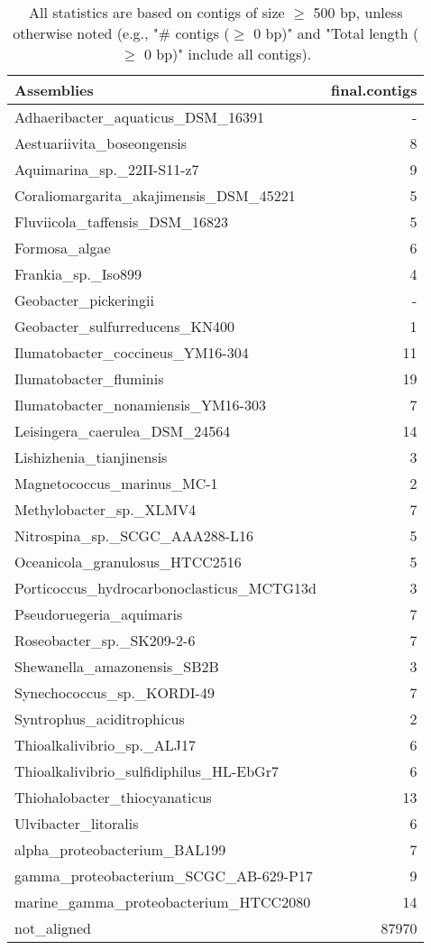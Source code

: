 \documentclass[12pt,a4paper]{article}
\begin{document}
\begin{table}[ht]
\begin{center}
\caption{All statistics are based on contigs of size $\geq$ 500 bp, unless otherwise noted (e.g., "\# contigs ($\geq$ 0 bp)" and "Total length ($\geq$ 0 bp)" include all contigs).}
\begin{tabular}{|l*{1}{|r}|}
\hline
Assemblies & final.contigs \\ \hline
Adhaeribacter\_aquaticus\_DSM\_16391 & - \\ \hline
Aestuariivita\_boseongensis & 8 \\ \hline
Aquimarina\_sp.\_22II-S11-z7 & 9 \\ \hline
Coraliomargarita\_akajimensis\_DSM\_45221 & 5 \\ \hline
Fluviicola\_taffensis\_DSM\_16823 & 5 \\ \hline
Formosa\_algae & 6 \\ \hline
Frankia\_sp.\_Iso899 & 4 \\ \hline
Geobacter\_pickeringii & - \\ \hline
Geobacter\_sulfurreducens\_KN400 & 1 \\ \hline
Ilumatobacter\_coccineus\_YM16-304 & 11 \\ \hline
Ilumatobacter\_fluminis & 19 \\ \hline
Ilumatobacter\_nonamiensis\_YM16-303 & 7 \\ \hline
Leisingera\_caerulea\_DSM\_24564 & 14 \\ \hline
Lishizhenia\_tianjinensis & 3 \\ \hline
Magnetococcus\_marinus\_MC-1 & 2 \\ \hline
Methylobacter\_sp.\_XLMV4 & 7 \\ \hline
Nitrospina\_sp.\_SCGC\_AAA288-L16 & 5 \\ \hline
Oceanicola\_granulosus\_HTCC2516 & 5 \\ \hline
Porticoccus\_hydrocarbonoclasticus\_MCTG13d & 3 \\ \hline
Pseudoruegeria\_aquimaris & 7 \\ \hline
Roseobacter\_sp.\_SK209-2-6 & 7 \\ \hline
Shewanella\_amazonensis\_SB2B & 3 \\ \hline
Synechococcus\_sp.\_KORDI-49 & 7 \\ \hline
Syntrophus\_aciditrophicus & 2 \\ \hline
Thioalkalivibrio\_sp.\_ALJ17 & 6 \\ \hline
Thioalkalivibrio\_sulfidiphilus\_HL-EbGr7 & 6 \\ \hline
Thiohalobacter\_thiocyanaticus & 13 \\ \hline
Ulvibacter\_litoralis & 6 \\ \hline
alpha\_proteobacterium\_BAL199 & 7 \\ \hline
gamma\_proteobacterium\_SCGC\_AB-629-P17 & 9 \\ \hline
marine\_gamma\_proteobacterium\_HTCC2080 & 14 \\ \hline
not\_aligned & 87970 \\ \hline
\end{tabular}
\end{center}
\end{table}
\end{document}
